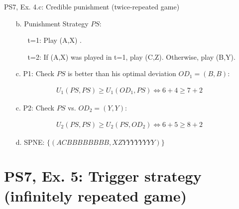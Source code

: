 \begin{frame}{PS7, Ex. 4.c: Credible punishment (twice-repeated game)}
\begin{multicols}{2}
\begin{enumerate}
\begin{itemize}
          \item[t=1:] (A,X) (not a stage game NE)
          \item[t=2:] (C,Z) (a stage game NE)
        \end{itemize}
        \item[b.] Punishment Strategy $PS$:
        \begin{itemize}\normalsize
          \item[t=1:] Play (A,X) .
          \item[t=2:] If (A,X) was played in t=1, play (C,Z). Otherwise, play (B,Y).
        \end{itemize}
        \item[c.] P1: Check $PS$ is better than his optimal deviation $OD_1=(B,B)$:
      \end{enumerate}
      \vspace{-14pt}
      \begin{align*}
          U_1(PS,PS)\geq U_1(OD_1,PS)\Leftrightarrow6+4\geq7+2%
      \end{align*}
      \vspace{-22pt}
      \begin{itemize}
          \item[c.] P2: Check $PS$ vs. $OD_2=(Y,Y)$:
      \end{itemize}
      \vspace{-14pt}
      \begin{align*}
          U_2(PS,PS)\geq U_2(PS,OD_2)\Leftrightarrow6+5\geq8+2%
      \end{align*}
      \vspace{-24pt}
      \begin{itemize}
          \item[d.] SPNE: $\{(ACBBBBBBBB,XZYYYYYYYY)\}$
      \end{itemize}
      \vfill\null
    \end{multicols}
\end{frame}



\section{PS7, Ex. 5: Trigger strategy (infinitely repeated game)}

